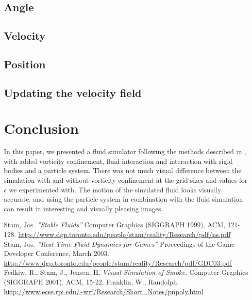 \documentclass[a4paper,twoside,11pt,twocolumn]{article}
\begin{document}
\subsection{Angle}

\subsection{Velocity}

\subsection{Position}

\subsection{Updating the velocity field}

\section{Conclusion}
In this paper, we presented a fluid simulator following the methods described in \cite{url:stam1, url:stam2}, with added vorticity confinement, fluid interaction and interaction with rigid bodies and a particle system. There was not much visual difference between the simulation with and without vorticity confinement at the grid sizes and values for $\epsilon$ we experimented with.
The motion of the simulated fluid looks visually accurate, and using the particle system in combination with the fluid simulation can result in interesting and visually pleasing images.


\begin{thebibliography}{9}
		Stam, Jos. \emph{''Stable Fluids''} Computer Graphics (SIGGRAPH 1999), ACM, 121-128. \url{http://www.dgp.toronto.edu/people/stam/reality/Research/pdf/ns.pdf}
		Stam, Jos. \emph{''Real-Time Fluid Dynamics for Games''} Proceedings of the Game Developer Conference, March 2003. \url{http://www.dgp.toronto.edu/people/stam/reality/Research/pdf/GDC03.pdf}
		Fedkiw, R., Stam, J., Jensen, H. \emph{Visual Simulation of Smoke.} Computer Graphics (SIGGRAPH 2001), ACM, 15-22.
		Franklin, W., Randolph. \url{http://www.ecse.rpi.edu/\~wrf/Research/Short\_Notes/pnpoly.html}
\end{thebibliography}
\end{document}
